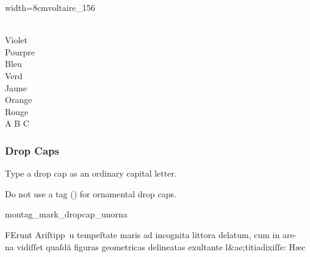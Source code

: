 \begin{sampleImageSmall}{width=8cm}{voltaire_156}
\begin{typeLatin}
 \\
Violet \\
Pourpre \\
Bleu \\
Verd \\
Jaune \\
Orange \\
Rouge \\
A B C \\
\end{typeLatin}
\end{sampleImageSmall}

\subsubsection{Drop Caps}
\label{section drop caps}

\begin{mainrule}
Type a drop cap as an ordinary capital letter.
\end{mainrule}

\begin{clarification}
Do not use a  tag () for ornamental drop caps.
\end{clarification}

\vspace{2mm}
\begin{sampleImage}{montag_mark_dropcap_unorna}
\begin{typeLatin}
FErunt Ariſtipp\bs~u tempeſtate maris ad incognita littora delatum, cum in are- \\
na vidiſſet quaſdã figuras geometricas delineatas exultant\bs\tld{}e l&ae;titia\lwr dixiſſe: Hæc \\
\someText {}
\end{typeLatin}
\end{sampleImage}

